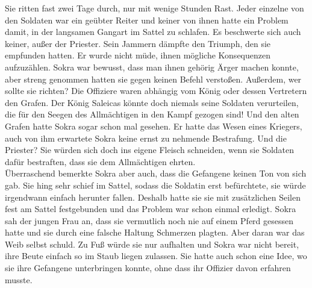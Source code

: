 Sie ritten fast zwei Tage durch, nur mit wenige Stunden Rast. Jeder einzelne von den Soldaten war 
ein geübter Reiter und keiner von ihnen hatte ein Problem damit, in der langsamen Gangart im Sattel 
zu schlafen. Es beschwerte sich auch keiner, außer der Priester. Sein Jammern dämpfte den Triumph, 
den sie empfunden hatten. Er wurde nicht müde, ihnen mögliche Konsequenzen aufzuzählen. Sokra war 
bewusst, dass man ihnen gehörig Ärger machen konnte, aber streng genommen hatten sie gegen keinen 
Befehl verstoßen. Außerdem, wer sollte sie richten? Die Offiziere waren abhängig vom König oder 
dessen Vertretern den Grafen. Der König Saleicas könnte doch niemals seine Soldaten verurteilen, 
die für den Seegen des Allmächtigen in den Kampf gezogen sind! Und den alten Grafen hatte Sokra 
sogar schon mal gesehen. Er hatte das Wesen eines Kriegers, auch von ihm erwartete Sokra keine 
ernst zu nehmende Bestrafung. Und die Priester? Sie würden sich doch ins eigene Fleisch schneiden, 
wenn sie Soldaten dafür bestraften, dass sie dem Allmächtigen ehrten.\\
Überraschend bemerkte Sokra aber auch, dass die Gefangene keinen Ton von sich gab. Sie hing sehr 
schief im Sattel, sodass die Soldatin erst befürchtete, sie würde irgendwann einfach herunter 
fallen. Deshalb hatte sie sie mit zusätzlichen Seilen fest am Sattel festgebunden und das Problem 
war schon einmal erledigt. Sokra sah der jungen Frau an, dass sie vermutlich noch nie auf einem 
Pferd gesessen hatte und sie durch eine falsche Haltung Schmerzen plagten. Aber daran war das Weib 
selbst schuld. Zu Fuß würde sie nur aufhalten und Sokra war nicht bereit, ihre Beute einfach so im 
Staub liegen zulassen. Sie hatte auch schon eine Idee, wo sie ihre Gefangene unterbringen konnte, 
ohne dass ihr Offizier davon erfahren musste.\\

